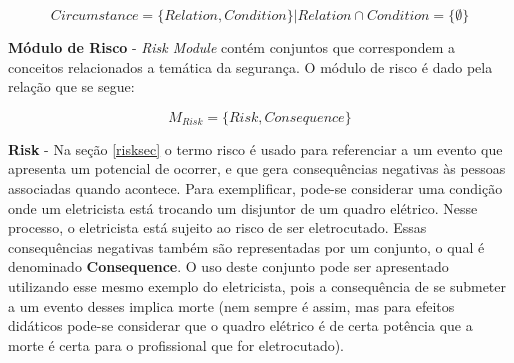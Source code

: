 \begin{equation}
    Circumstance = \{ Relation, Condition \} |  Relation \cap Condition = \{ \emptyset \}
\end{equation}


\textbf{Módulo de Risco} - \textit{Risk Module} contém conjuntos que correspondem a conceitos relacionados a temática da segurança.
O módulo de risco é dado pela relação que se segue:

\begin{equation}
    M_{Risk} = \{ Risk, Consequence \}
\end{equation}

\textbf{Risk} - Na seção \ref{risksec} o termo risco é usado para referenciar a um evento que apresenta um potencial de ocorrer, e que gera consequências negativas às pessoas associadas quando acontece. Para exemplificar, pode-se considerar uma condição onde um eletricista está trocando um disjuntor de um quadro elétrico. Nesse processo, o eletricista está sujeito ao risco de ser eletrocutado. Essas consequências negativas também são representadas por um conjunto, o qual é denominado \textbf{Consequence}. O uso deste conjunto pode ser apresentado utilizando esse mesmo exemplo do eletricista, pois a consequência de se submeter a um evento desses implica morte (nem sempre é assim, mas para efeitos didáticos pode-se considerar que o quadro elétrico é de certa potência que a morte é certa para o profissional que for eletrocutado).